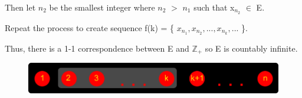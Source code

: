 	Then let $n_2$ be the smallest integer where $n_2$ $>$ $n_1$ such that x$_{n_2}$ $\in$ E.

	Repeat the process to create sequence f(k) = \{ $x_{n_1}, x_{n_2}, ... , x_{n_k} , ...$ \}.

	Thus, there is a 1-1 correspondence between E and $\mathbb{Z}_+$ so
	E is countably infinite.

\begin{figure}[h]
	\centering
	\includegraphics[scale=0.5]{Images/4.3.6.png}
\end{figure}





